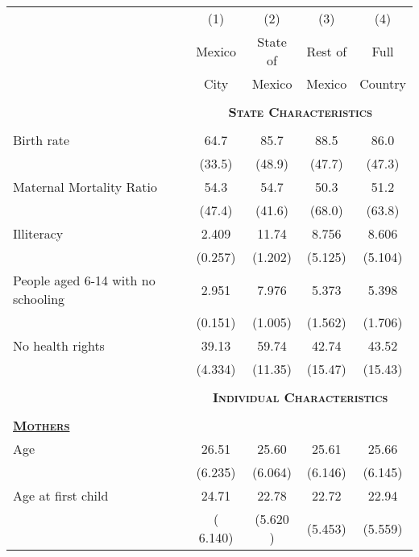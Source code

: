  
 
  	
  	
 
 
 
 
{\small 	\begin{tabular}{lcccc}\toprule\toprule
		& (1) & (2) & (3) & (4) \\ 
  	& Mexico & State of & Rest of & Full \\ 
 	&City&Mexico&Mexico&Country \\ 
	
	
	\hline &&&&\\
		 \multirow{1}{*}{} &
		 \multicolumn{4}{c}{\textbf{\textsc{State Characteristics}} }\\\cline{2-5}
 &&&&\\
 Birth rate & 64.7&85.7 &88.5 &86.0\\
 &(33.5)&(48.9)&(47.7)&(47.3) \\
	Maternal Mortality Ratio &  54.3&54.7 &50.3 &51.2\\
	 &(47.4)&(41.6)&(68.0)&(63.8) \\
	Illiteracy      &       2.409&       11.74&       8.756&       8.606\\
	&     (0.257)&     (1.202)&     (5.125)&     (5.104)\\
	
	People aged 6-14 with no schooling   &       2.951&       7.976&       5.373&       5.398\\
	&     (0.151)&     (1.005)&     (1.562)&     (1.706)\\
	
	No health rights    &       39.13&       59.74&       42.74&       43.52\\
	&     (4.334)&     (11.35)&     (15.47)&     (15.43)\\
 

	 &&&&\\
			 \multirow{1}{*}{} &
			 \multicolumn{4}{c}{\textbf{\textsc{Individual Characteristics}} }\\\cline{2-5}
		&&&&\\
 	 
 	\textbf{\textsc{\underline{Mothers}}}	&&&&\\
 	  
 	  Age & 26.51& 25.60&25.61 &25.66\\
 		&(6.235)&(6.064)&(6.146)&(6.145)\\
 	  Age at first child& 24.71& 22.78& 22.72& 22.94  \\
 		&( 6.140)&(5.620 )&(5.453)&(5.559)\\
 		 

\end{tabular}}
